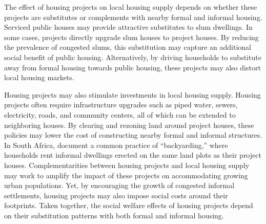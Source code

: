 \documentclass[12pt]{article}
\begin{document}
The effect of housing projects on local housing supply depends on whether these projects are substitutes or complements with nearby formal and informal housing.  Serviced public houses may provide attractive substitutes to slum dwellings.  In some cases, projects directly upgrade slum houses to project houses.  By reducing the prevalence of congested slums, this substitution may capture an additional social benefit of public housing.  Alternatively, by driving households to substitute away from formal housing towards public housing, these projects may also distort local housing markets.

Housing projects may also stimulate investments in local housing supply.  Housing projects often require infrastructure upgrades such as piped water, sewers, electricity, roads, and community centers, all of which can be extended to neighboring houses.  By clearing and rezoning land around project houses, these policies may lower the cost of constructing nearby formal and informal structures.  In South Africa, \cite{Brueckner2018backyarding} document a common practice of ``backyarding,'' where households rent informal dwellings erected on the same land plots as their project houses.  Complementarities between housing projects and local housing supply may work to amplify the impact of these projects on accommodating growing urban populations.  Yet, by encouraging the growth of congested informal settlements, housing projects may also impose social costs around their footprints.  Taken together, the social welfare effects of housing projects depend on their substitution patterns with both formal and informal housing.





\end{document}

